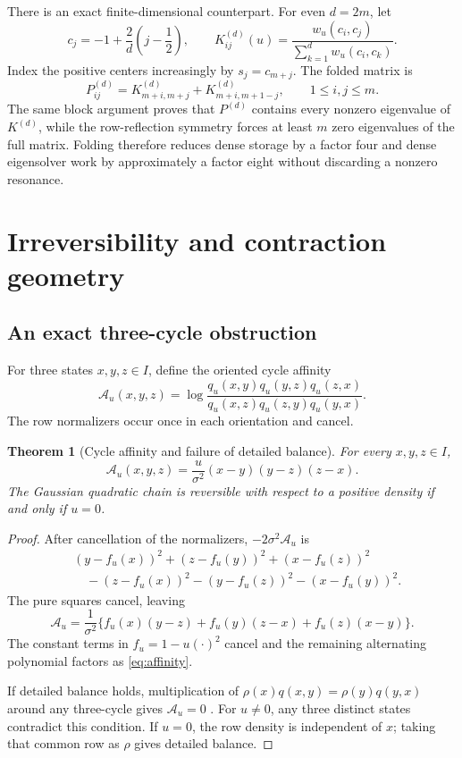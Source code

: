 \documentclass[11pt]{article}
\newtheorem{theorem}{Theorem}[section]
\theoremstyle{definition}
\theoremstyle{remark}
\begin{document}
There is an exact finite-dimensional counterpart.  For even $d=2m$, let
\[
 c_j=-1+\frac{2}{d}\left(j-\frac12\right),
 \qquad
 K_{ij}^{(d)}(u)=
 \frac{w_u(c_i,c_j)}{\sum_{k=1}^dw_u(c_i,c_k)}.
\]
Index the positive centers increasingly by $s_j=c_{m+j}$.  The folded matrix
is
\begin{equation}\label{eq:folded-matrix}
 P_{ij}^{(d)}=K_{m+i,m+j}^{(d)}+K_{m+i,m+1-j}^{(d)},
 \qquad 1\le i,j\le m.
\end{equation}
The same block argument proves that $P^{(d)}$ contains every nonzero
eigenvalue of $K^{(d)}$, while the row-reflection symmetry forces at least
$m$ zero eigenvalues of the full matrix.  Folding therefore reduces dense
storage by a factor four and dense eigensolver work by approximately a factor
eight without discarding a nonzero resonance.

\section{Irreversibility and contraction geometry}
\label{sec:irreversibility}

\subsection{An exact three-cycle obstruction}

For three states $x,y,z\in I$, define the oriented cycle affinity
\begin{equation}\label{eq:affinity-def}
 \mathcal A_u(x,y,z)
 =\log\frac{q_u(x,y)q_u(y,z)q_u(z,x)}
 {q_u(x,z)q_u(z,y)q_u(y,x)}.
\end{equation}
The row normalizers occur once in each orientation and cancel.

\begin{theorem}[Cycle affinity and failure of detailed balance]
\label{thm:affinity}
For every $x,y,z\in I$,
\begin{equation}\label{eq:affinity}
 \mathcal A_u(x,y,z)
 =\frac{u}{\sigma^2}(x-y)(y-z)(z-x).
\end{equation}
The Gaussian quadratic chain is reversible with respect to a positive density
if and only if $u=0$.
\end{theorem}

\begin{proof}
After cancellation of the normalizers, $-2\sigma^2\mathcal A_u$ is
\begin{align*}
 &(y-f_u(x))^2+(z-f_u(y))^2+(x-f_u(z))^2\\
 &\quad -(z-f_u(x))^2-(y-f_u(z))^2-(x-f_u(y))^2.
\end{align*}
The pure squares cancel, leaving
\[
 \mathcal A_u=\frac{1}{\sigma^2}
 \{f_u(x)(y-z)+f_u(y)(z-x)+f_u(z)(x-y)\}.
\]
The constant terms in $f_u=1-u(\cdot)^2$ cancel and the remaining alternating
polynomial factors as \eqref{eq:affinity}.

If detailed balance holds, multiplication of
$\rho(x)q(x,y)=\rho(y)q(y,x)$ around any three-cycle gives
$\mathcal A_u=0$ \citep{Kelly1979,Norris1997}.  For $u\ne0$, any three distinct
states contradict this condition.  If $u=0$, the row density is independent
of $x$; taking that common row as $\rho$ gives detailed balance.
\end{proof}
\end{document}
